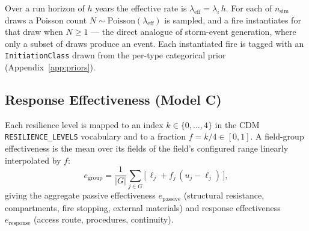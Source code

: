 \documentclass[11pt,a4paper]{article}
\begin{document}
Over a run horizon of $h$ years the effective rate is
$\lambda_{\text{eff}} = \lambda_i\, h$. For each of $n_{\text{sim}}$ draws a
Poisson count $N \sim \text{Poisson}(\lambda_{\text{eff}})$ is sampled, and a
fire instantiates for that draw when $N \ge 1$ --- the direct analogue of
storm-event generation, where only a subset of draws produce an event. Each
instantiated fire is tagged with an \texttt{InitiationClass} drawn from the
per-type categorical prior (Appendix~\ref{app:priors}).

\subsection{Response Effectiveness (Model C)}

Each resilience level is mapped to an index $k \in \{0,\dots,4\}$ in the CDM
\texttt{RESILIENCE\_LEVELS} vocabulary and to a fraction
$f = k/4 \in [0,1]$. A field-group effectiveness is the mean over its fields of
the field's configured range linearly interpolated by $f$:
\[
e_{\text{group}} = \frac{1}{|G|}\sum_{j\in G}
   \big[\,\ell_j + f_j\,(u_j - \ell_j)\,\big],
\]
giving the aggregate passive effectiveness $e_{\text{passive}}$ (structural
resistance, compartments, fire stopping, external materials) and response
effectiveness $e_{\text{response}}$ (access route, procedures, continuity).
\end{document}
